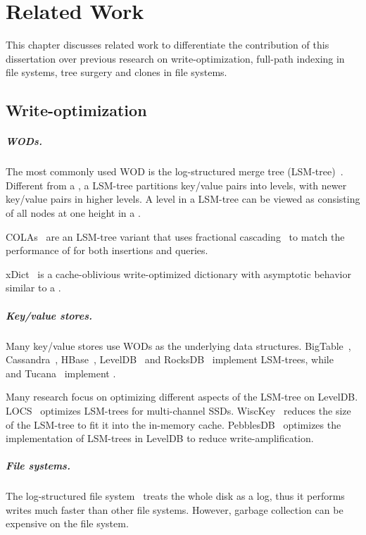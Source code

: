 \chapter{Related Work}
\label{chap:related}

This chapter discusses related work to differentiate the contribution of
this dissertation
over previous research on write-optimization, full-path indexing in file
systems, tree surgery and clones in file systems.

\section{Write-optimization}

\paragraph{WODs.}
The most commonly used WOD is the log-structured merge tree (LSM-tree)~\cite{lsm}.
Different from a \bet, a LSM-tree partitions key/value pairs into levels, with
newer key/value pairs in higher levels.
A level in a LSM-tree can be viewed as consisting of all nodes at one height in
a \bet.

COLAs~\citep{cola} are an LSM-tree variant that uses fractional
cascading~\citep{fcascading} to match the performance of \bets for both
insertions and queries.

xDict~\citep{xdict} is a cache-oblivious write-optimized dictionary with
asymptotic behavior similar to a \bet.

\paragraph{Key/value stores.}
Many key/value stores use WODs as the underlying data structures.
BigTable~\citep{bigtable}, Cassandra~\citep{cassandra}, HBase~\citep{hbase},
LevelDB~\citep{leveldb} and RocksDB~\citep{rocksdb} implement LSM-trees,
while \fti~\cite{fti} and Tucana~\cite{tucana} implement \bets.

Many research focus on optimizing different aspects of the LSM-tree on LevelDB.
LOCS~\citep{locs} optimizes LSM-trees for multi-channel SSDs.
WiscKey~\citep{wisckey} reduces the size of the LSM-tree to fit it into the
in-memory cache.
PebblesDB~\citep{pebble} optimizes the implementation of LSM-trees in LevelDB to
reduce write-amplification.

\paragraph{File systems.}
The log-structured file system~\citep{lfs} treats the whole disk as a log,
thus it performs writes much faster than other file systems.
However, garbage collection can be expensive on the file system.

